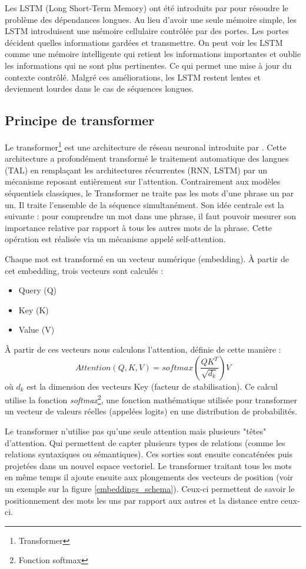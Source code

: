 Les LSTM (Long Short-Term Memory) ont été introduits par \citet{hochreiter_1997} pour résoudre le problème des dépendances longues.
Au lieu d’avoir une seule mémoire simple, les LSTM introduisent une mémoire cellulaire contrôlée par des portes.
Les portes décident quelles informations gardées et transmettre.
On peut voir les LSTM comme une mémoire intelligente qui retient les informations importantes et oublie les informations
qui ne sont plus pertinentes. Ce qui permet une mise à jour du contexte contrôlé.
Malgré ces améliorations, les LSTM restent lentes et deviennent lourdes dans le cas de séquences longues.

\subsection{Principe de transformer}

Le transformer\footnote{\gls{Transformer}} est une architecture de réseau neuronal introduite par \citet{vaswani_2017}.
Cette architecture a profondément transformé le traitement automatique des langues (TAL) en remplaçant
les architectures récurrentes (RNN, LSTM) par un mécanisme reposant entièrement sur l’attention.
Contrairement aux modèles séquentiels classiques, le Transformer ne traite pas les mots d’une phrase
un par un. Il traite l’ensemble de la séquence simultanément. Son idée centrale est la suivante{ :}
pour comprendre un mot dans une phrase, il faut pouvoir mesurer son importance relative par
rapport à tous les autres mots de la phrase. Cette opération est réalisée via un mécanisme appelé self-attention.

Chaque mot est transformé en un vecteur numérique (embedding).
À partir de cet embedding, trois vecteurs sont calculés{ :}
\begin{itemize}
    \item Query (Q)
    \item Key (K)
    \item Value (V)
\end{itemize}
À partir de ces vecteurs nous calculons l'attention, définie de cette manière{ :}
\[ Attention(Q,K,V)=softmax(\frac{QK^{T}}{\sqrt{d_{k}}})V \]
où \( d_{k} \) est la dimension des vecteurs Key (facteur de stabilisation).
Ce calcul utilise la fonction \textit{softmax}\footnote{\gls{Fonction softmax}}, une fonction
mathématique utilisée pour transformer un vecteur de valeurs réelles (appelées logits)
en une distribution de probabilités.

Le transformer n'utilise pas qu'une seule attention mais plusieurs "têtes" d'attention. Qui
permettent de capter plusieurs types de relations (comme les relations syntaxiques ou sémantiques).
Ces sorties sont ensuite concaténées puis projetées dans un nouvel espace vectoriel.
Le transformer traitant tous les mots en même temps il ajoute ensuite aux plongements des vecteurs
de position (voir un exemple sur la figure \ref{embeddings_schema}). Ceux-ci permettent de savoir le positionnement des mots les uns par rapport aux autres 
et la distance entre ceux-ci.

